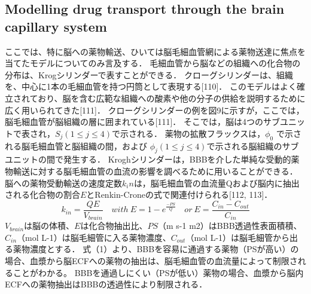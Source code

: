 \documentclass[11pt,a4paper]{jsarticle}
\begin{document}
\subsection{Modelling drug transport through the brain capillary system}
ここでは、特に脳への薬物輸送、ひいては脳毛細血管網による薬物送達に焦点を当てたモデルについてのみ言及する．
毛細血管から脳などの組織への化合物の分布は、Krogシリンダーで表すことができる．
クローグシリンダーは、組織を、中心に1本の毛細血管を持つ円筒として表現する[110]．
このモデルはよく確立されており、脳を含む広範な組織への酸素や他の分子の供給を説明するために広く用いられてきた[111]．
クローグシリンダーの例を図9に示すが，ここでは，脳毛細血管が脳組織の層に囲まれている[111]．
そこでは，脳は4つのサブユニットで表され，$S_j(1≤j≤4)$で示される．
薬物の拡散フラックスは，$\phi_0$ で示される脳毛細血管と脳組織の間，および $\phi_j(1≤j ≤ 4)$で示される脳組織のサブユニットの間で発生する．
Kroghシリンダーは，BBBを介した単純な受動的薬物輸送に対する脳毛細血管の血流の影響を調べるために用いることができる．
脳への薬物受動輸送の速度定数$k_in$は，脳毛細血管の血流量Qおよび脳内に抽出される化合物の割合$E$とRenkin-Croneの式で関連付けられる[112, 113]．
\begin{equation}
    k_{in}=\frac{QE}{V_{brain}}\quad with\ E=1-e^{\frac{-PS}{Q}} \quad or\ E=\frac{C_{in}-C_{out}}{C_{in}}
\end{equation}
$V_{brain}$は脳の体積、$E$は化合物抽出比、$PS$（m s-1 m2）はBBB透過性表面積積、
$C_{in}$（mol L-1）は脳毛細管に入る薬物濃度、$C_{out}$（mol L-1）は脳毛細管から出る薬物濃度とする．
式（1）より、BBBを容易に通過する薬物（PSが高い）の場合、血漿から脳ECFへの薬物の抽出は、脳毛細血管の血流量によって制限されることがわかる。
BBBを通過しにくい（PSが低い）薬物の場合、血漿から脳内ECFへの薬物抽出はBBBの透過性により制限される．
\end{document}
